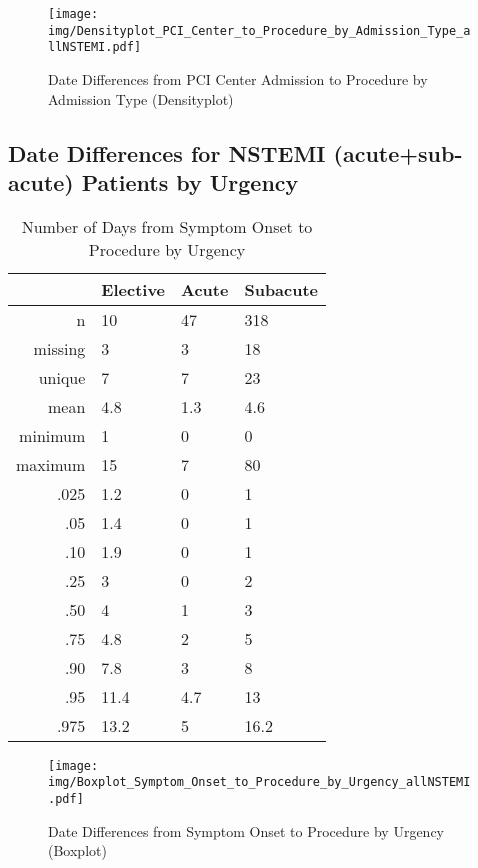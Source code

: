 \documentclass[presentation,xcolor=pdftex,dvipsnames,table,11pt]{beamer}
\begin{document}
\begin{tiny}
\begin{frame}
\begin{figure}
  \centering
  \caption{Date Differences from PCI Center Admission to Procedure by Admission Type (Densityplot)}
  \label{Density: Date Differences from PCI Center Admission to Procedure by Admission Type}
\texttt{[image: img/Densityplot\_PCI\_Center\_to\_Procedure\_by\_Admission\_Type\_allNSTEMI.pdf]}\end{figure}
\end{frame}





\subsection{Date Differences for NSTEMI (acute+sub-acute) Patients by Urgency}

\begin{table}[ht]
\centering
\begin{tabular}{rlll}
  \toprule
 & Elective & Acute & Subacute \\ 
  \midrule
n & 10 & 47 & 318 \\ 
  missing & 3 & 3 & 18 \\ 
  unique & 7 & 7 & 23 \\ 
  mean & 4.8 & 1.3 & 4.6 \\ 
  minimum & 1 & 0 & 0 \\ 
  maximum & 15 & 7 & 80 \\ 
  .025 & 1.2 & 0 & 1 \\ 
  .05 & 1.4 & 0 & 1 \\ 
  .10 & 1.9 & 0 & 1 \\ 
  .25 & 3 & 0 & 2 \\ 
  .50 & 4 & 1 & 3 \\ 
  .75 & 4.8 & 2 & 5 \\ 
  .90 & 7.8 & 3 & 8 \\ 
  .95 & 11.4 & 4.7 & 13 \\ 
  .975 & 13.2 & 5 & 16.2 \\ 
   \bottomrule
\end{tabular}
\caption{Number of Days from Symptom Onset to Procedure by Urgency} 
\end{table}
\begin{frame}
\begin{figure}
  \centering
  \caption{Date Differences from Symptom Onset to Procedure by Urgency (Boxplot)}
  \label{Boxplot: Date Differences from Symptom Onset to Procedure by Urgency}
\texttt{[image: img/Boxplot\_Symptom\_Onset\_to\_Procedure\_by\_Urgency\_allNSTEMI.pdf]}\end{figure}
\end{frame}



\end{tiny}
\end{document}

